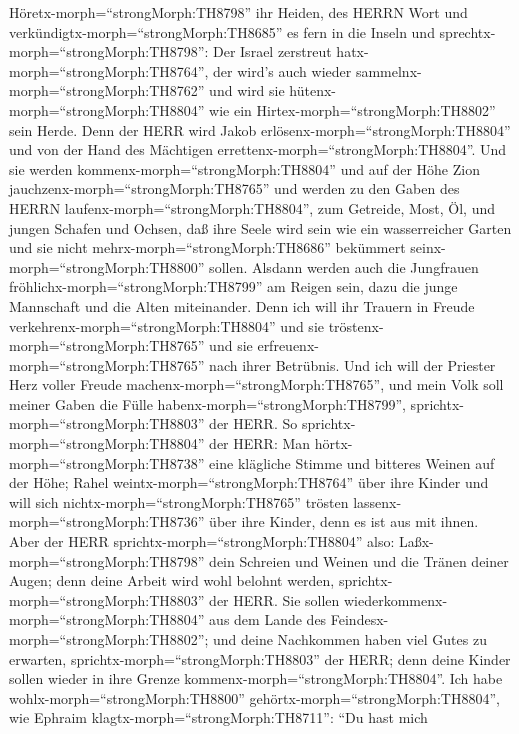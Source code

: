 Höretx-morph=``strongMorph:TH8798'' ihr Heiden, des HERRN Wort und
verkündigtx-morph=``strongMorph:TH8685'' es fern in die Inseln und
sprechtx-morph=``strongMorph:TH8798'': Der Israel zerstreut
hatx-morph=``strongMorph:TH8764'', der wird's auch wieder
sammelnx-morph=``strongMorph:TH8762'' und wird sie
hütenx-morph=``strongMorph:TH8804'' wie ein
Hirtex-morph=``strongMorph:TH8802'' sein Herde.  Denn der
HERR wird Jakob erlösenx-morph=``strongMorph:TH8804'' und von der Hand
des Mächtigen errettenx-morph=``strongMorph:TH8804''.  Und
sie werden kommenx-morph=``strongMorph:TH8804'' und auf der Höhe Zion
jauchzenx-morph=``strongMorph:TH8765'' und werden zu den Gaben des HERRN
laufenx-morph=``strongMorph:TH8804'', zum Getreide, Most, Öl, und jungen
Schafen und Ochsen, daß ihre Seele wird sein wie ein wasserreicher
Garten und sie nicht mehrx-morph=``strongMorph:TH8686'' bekümmert
seinx-morph=``strongMorph:TH8800'' sollen.  Alsdann werden
auch die Jungfrauen fröhlichx-morph=``strongMorph:TH8799'' am Reigen
sein, dazu die junge Mannschaft und die Alten miteinander. Denn ich will
ihr Trauern in Freude verkehrenx-morph=``strongMorph:TH8804'' und sie
tröstenx-morph=``strongMorph:TH8765'' und sie
erfreuenx-morph=``strongMorph:TH8765'' nach ihrer Betrübnis.
 Und ich will der Priester Herz voller Freude
machenx-morph=``strongMorph:TH8765'', und mein Volk soll meiner Gaben
die Fülle habenx-morph=``strongMorph:TH8799'',
sprichtx-morph=``strongMorph:TH8803'' der HERR.  So
sprichtx-morph=``strongMorph:TH8804'' der HERR: Man
hörtx-morph=``strongMorph:TH8738'' eine klägliche Stimme und bitteres
Weinen auf der Höhe; Rahel weintx-morph=``strongMorph:TH8764'' über ihre
Kinder und will sich nichtx-morph=``strongMorph:TH8765'' trösten
lassenx-morph=``strongMorph:TH8736'' über ihre Kinder, denn es ist aus
mit ihnen.  Aber der HERR
sprichtx-morph=``strongMorph:TH8804'' also:
Laßx-morph=``strongMorph:TH8798'' dein Schreien und Weinen und die
Tränen deiner Augen; denn deine Arbeit wird wohl belohnt werden,
sprichtx-morph=``strongMorph:TH8803'' der HERR. Sie sollen
wiederkommenx-morph=``strongMorph:TH8804'' aus dem Lande des
Feindesx-morph=``strongMorph:TH8802'';  und deine
Nachkommen haben viel Gutes zu erwarten,
sprichtx-morph=``strongMorph:TH8803'' der HERR; denn deine Kinder sollen
wieder in ihre Grenze kommenx-morph=``strongMorph:TH8804''.
 Ich habe wohlx-morph=``strongMorph:TH8800''
gehörtx-morph=``strongMorph:TH8804'', wie Ephraim
klagtx-morph=``strongMorph:TH8711'': ``Du hast mich
